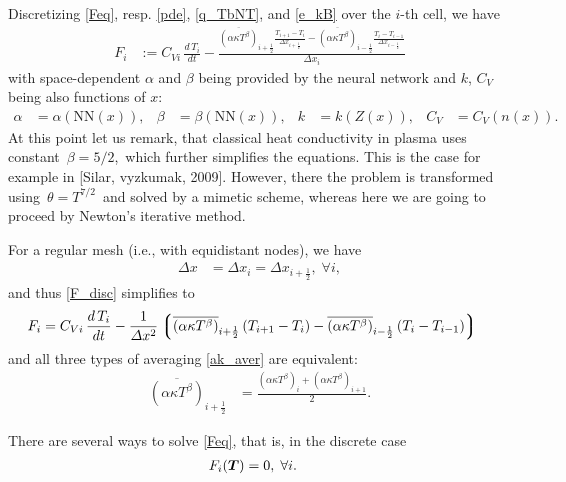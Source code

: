 \documentclass[12pt]{article}
\newcommand{\dx}{\Delta x}
\newcommand{\oh}{\frac{1}{2}}
\newcommand{\imh}{i-\oh}
\newcommand{\iph}{i+\oh}
\def\cond{\kappa}
\begin{document}
Discretizing \eqref{Feq}, resp. \eqref{pde}, \eqref{q_TbNT}, and \eqref{e_kB}
over the $i$-th cell, we have
\begin{align}\label{F_disc}
  F_i&:= C_{Vi}\,\frac{d\,T_i}{dt}
  - \frac{\overline{\left(\alpha\cond T^\beta\right)}_{\iph}
          \frac{T_{i+1}-T_{i}}{\dx_{\iph}}
        - \overline{\left(\alpha\cond T^\beta\right)}_{\imh}
          \frac{T_{i}-T_{i-1}}{\dx_{\imh}}
  }{\dx_i}
\end{align}
with space-dependent $\alpha$ and $\beta$ being provided by the neural network
and $k$, $C_V$ being also functions of $x$:
\begin{align}
 \alpha&=\alpha(\mathrm{NN}(x)),&
 \beta&=\beta(\mathrm{NN}(x)),&
 k&=k(Z(x)),&
 C_V&=C_V(n(x)).
\end{align}
At this point let us remark, that classical heat conductivity in plasma
uses constant \,$\beta=5/2$,\, which further simplifies the equations. This is the case
for example in [Silar, vyzkumak, 2009]. However, there the problem is transformed
using \,$\theta=T^{7/2}$\, and solved by a mimetic scheme, whereas here we are going
to proceed by Newton's iterative method.

For a regular mesh (i.e., with equidistant nodes), we have
\begin{align}
  \dx &= \dx_i = \dx_{\iph}, \; \forall i,
\end{align}
and thus \eqref{F_disc} simplifies to
\begin{align}\label{F_disc_eq}
  F_i&= C_{Vi}\,\frac{d\,T_i}{dt}
  - \frac{1}{\dx^2}\left\lgroup
          \overline{\left(\alpha\cond T^\beta\right)}_{\iph}
          \left(T_{i+1}-T_{i}\right)
        - \overline{\left(\alpha\cond T^\beta\right)}_{\imh}
          \left(T_{i}-T_{i-1}\right)
          \right\rgroup
\end{align}
and all three types of averaging \eqref{ak_aver} are equivalent:
\begin{align}\label{ak_aver_eq}
  \overline{\left(\alpha\cond T^\beta\right)}_{\iph}
  &= \frac{\left(\alpha\cond T^\beta\right)_i
         + \left(\alpha\cond T^\beta\right)_{i+1}}{2}.
\end{align}

There are several ways to solve \eqref{Feq}, that is,
in the discrete case
\begin{align}\label{Feq_disc}
F_i(\vectorsym{T})&=0,\;\forall i.
\end{align}
\end{document}
